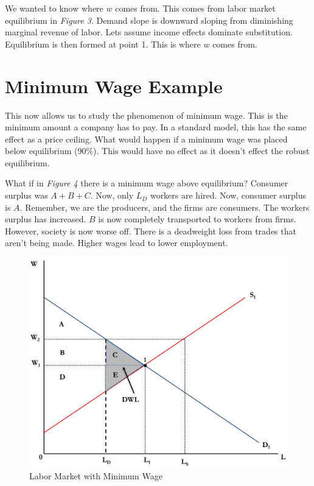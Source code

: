 \documentclass{article}
\begin{document}
We wanted to know where $w$ comes from. This comes from labor market equilibrium
in \textit{Figure 3}. Demand slope is downward sloping from diminishing marginal
revenue of labor. Lets assume income effects dominate substitution. Equilibrium
is then formed at point 1. This is where $w$ comes from.

\section{Minimum Wage Example}

This now allows us to study the phenomenon of minimum wage. This is the minimum
amount a company has to pay. In a standard model, this has the same effect as a
price ceiling. What would happen if a minimum wage was placed below equilibrium
(90\%). This would have no effect as it doesn't effect the robust equilibrium.

What if in \textit{Figure 4} there is a minimum wage above equilibrium? Consumer
surplus was $A+B+C$. Now,  only $L_{D}$ workers are hired. Now, consumer surplus
is $A$. Remember, we are the producers, and the firms are consumers. The workers
surplus has increased. $B$ is now completely transported to workers from firms.
However, society is now worse off. There is a deadweight loss from trades that
aren't being made. Higher wages lead to lower employment.

\begin{figure}[H]
    \centering
    \includegraphics[scale=0.33]{"Figure 4"}
    \caption{Labor Market with Minimum Wage}
\end{figure}
\end{document}
